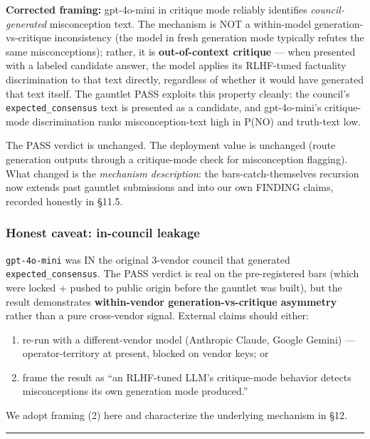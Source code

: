 \documentclass[
]{article}
\providecommand{\tightlist}{%
  \setlength{\itemsep}{0pt}\setlength{\parskip}{0pt}}
\begin{document}
\textbf{Corrected framing:} gpt-4o-mini in critique mode reliably
identifies \emph{council-generated} misconception text. The mechanism is
NOT a within-model generation-vs-critique inconsistency (the model in
fresh generation mode typically refutes the same misconceptions);
rather, it is \textbf{out-of-context critique} --- when presented with a
labeled candidate answer, the model applies its RLHF-tuned factuality
discrimination to that text directly, regardless of whether it would
have generated that text itself. The gauntlet PASS exploits this
property cleanly: the council's \texttt{expected\_consensus} text is
presented as a candidate, and gpt-4o-mini's critique-mode discrimination
ranks misconception-text high in P(NO) and truth-text low.

The PASS verdict is unchanged. The deployment value is unchanged (route
generation outputs through a critique-mode check for misconception
flagging). What changed is the \emph{mechanism description}: the
bars-catch-themselves recursion now extends past gauntlet submissions
and into our own FINDING claims, recorded honestly in §11.5.

\subsubsection{Honest caveat: in-council
leakage}\label{honest-caveat-in-council-leakage}

\texttt{gpt-4o-mini} was IN the original 3-vendor council that generated
\texttt{expected\_consensus}. The PASS verdict is real on the
pre-registered bars (which were locked + pushed to public origin before
the gauntlet was built), but the result demonstrates
\textbf{within-vendor generation-vs-critique asymmetry} rather than a
pure cross-vendor signal. External claims should either:

\begin{enumerate}
\def\labelenumi{\arabic{enumi}.}
\tightlist
\item
  re-run with a different-vendor model (Anthropic Claude, Google Gemini)
  --- operator-territory at present, blocked on vendor keys; or
\item
  frame the result as ``an RLHF-tuned LLM's critique-mode behavior
  detects misconceptions its own generation mode produced.''
\end{enumerate}

We adopt framing (2) here and characterize the underlying mechanism in
§12.

\begin{center}\rule{0.5\linewidth}{0.5pt}\end{center}
\end{document}
